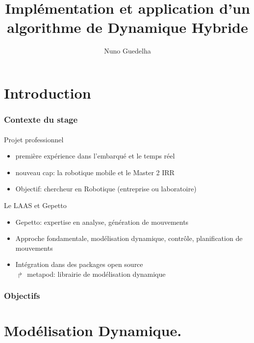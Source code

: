 \documentclass[11pt]{beamer}
\author{Nuno Guedelha}
\title{Implémentation et application d'un algorithme de Dynamique Hybride}
\institute{LAAS-CNRS}
\date{}
\begin{document}
\begin{frame}
\titlepage
\end{frame}

\begin{frame}
\tableofcontents
\end{frame}

\section{Introduction}

\begin{frame}
  \frametitle{Contexte du stage}
  \framesubtitle{}
  \begin{block}{Projet professionnel}
  \begin{itemize}
    \item première expérience dans l'embarqué et le temps réel
    \item nouveau cap: la robotique mobile et le Master 2 IRR
    \item Objectif: chercheur en Robotique (entreprise ou laboratoire)
  \end{itemize}
  \end{block}
  \begin{block}{Le LAAS et Gepetto}
  \begin{itemize}
    \item Gepetto: expertise en analyse, génération de mouvements  
    \item Approche fondamentale, modélisation dynamique, contrôle, planification de mouvements
    \item {Intégration dans des packages open source \\
          $\Rsh$ metapod: librairie de modélisation dynamique}
    \note{}
  \end{itemize}
  \end{block}
\end{frame}

\begin{frame}
  \frametitle{Objectifs}
  \framesubtitle{}
\end{frame}

\section{Modélisation Dynamique.}
\end{document}
